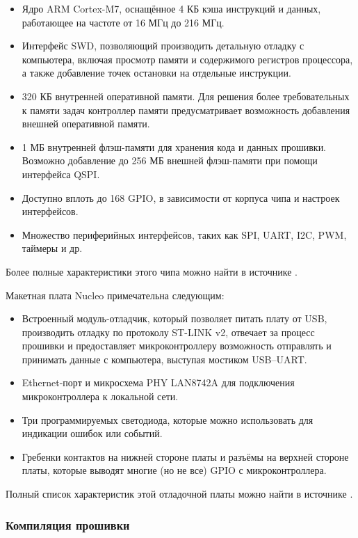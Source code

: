 \documentclass[rusmathsym, eqnumwithinsec, amspack, hyperref]{bomgost}
\begin{document}
\begin{itemize}
	\item Ядро ARM Cortex-M7, оснащённое 4 КБ кэша инструкций и данных, работающее на частоте от 16 МГц до 216 МГц.
	\item Интерфейс SWD, позволяющий производить детальную отладку с компьютера, включая просмотр памяти и содержимого регистров процессора, а также добавление точек остановки на отдельные инструкции.
	\item 320 КБ внутренней оперативной памяти. Для решения более требовательных к памяти задач контроллер памяти предусматривает возможность добавления внешней оперативной памяти.
	\item 1 МБ внутренней флэш-памяти для хранения кода и данных прошивки. Возможно добавление до 256 МБ внешней флэш-памяти при помощи интерфейса QSPI.
	\item Доступно вплоть до 168 GPIO, в зависимости от корпуса чипа и настроек интерфейсов.
	\item Множество периферийных интерфейсов, таких как SPI, UART, I2C, PWM, таймеры и др.
\end{itemize}

Более полные характеристики этого чипа можно найти в источнике \cite{STM32F746Datasheet}.

Макетная плата Nucleo примечательна следующим:

\begin{itemize}
	\item Встроенный модуль-отладчик, который позволяет питать плату от USB, производить отладку по протоколу ST-LINK v2, отвечает за процесс прошивки и предоставляет микроконтроллеру возможность отправлять и принимать данные с компьютера, выступая мостиком USB--UART.
	\item Ethernet-порт и микросхема PHY LAN8742A для подключения микроконтроллера к локальной сети.
	\item Три программируемых светодиода, которые можно использовать для индикации ошибок или событий.
	\item Гребенки контактов на нижней стороне платы и разъёмы на верхней стороне платы, которые выводят многие (но не все) GPIO с микроконтроллера.
\end{itemize}

Полный список характеристик этой отладочной платы можно найти в источнике \cite{NucleoDatasheet}.

\subsubsection{Компиляция прошивки}
\end{document}
